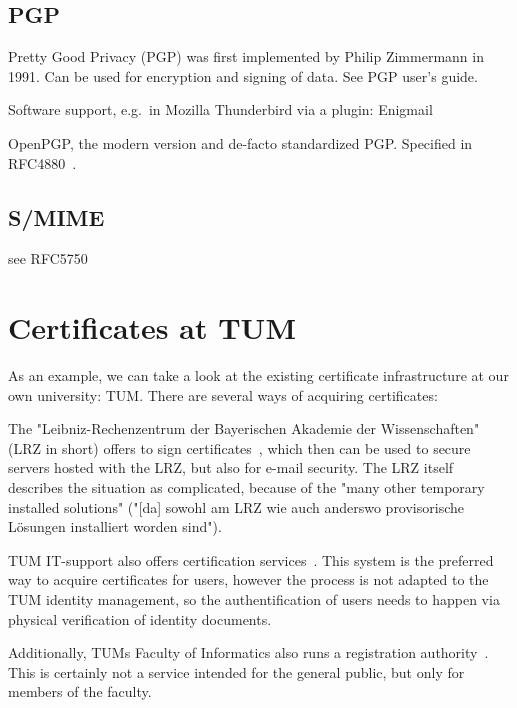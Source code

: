\subsection{PGP}\label{subsec:pgp}

Pretty Good Privacy (PGP) was first implemented by Philip Zimmermann in 1991.
Can be used for encryption and signing of data.
See PGP user's guide.

Software support, e.g.\ in Mozilla Thunderbird via a plugin: Enigmail

OpenPGP, the modern version and de-facto standardized PGP\@.
Specified in RFC4880~\cite{RFC4880}.

\subsection{S/MIME}\label{subsec:s/mime}
see RFC5750~\cite{RFC5750}

\section{Certificates at TUM}\label{sec:certificatesAtTum}
As an example, we can take a look at the existing certificate infrastructure at our own university: TUM\@.
There are several ways of acquiring certificates:

The "Leibniz-Rechenzentrum der Bayerischen Akademie der Wissenschaften" (LRZ in short) offers to sign
certificates~\cite{lrzpki}, which then can be used to secure servers hosted with the LRZ, but also for e-mail security.
The LRZ itself describes the situation as complicated, because of the "many other temporary installed solutions"
("[da] sowohl am LRZ wie auch anderswo provisorische L\"osungen installiert worden sind").

TUM IT-support also offers certification services~\cite{tumZertifikat}.
This system is the preferred way to acquire certificates for users, however the process is not adapted to the TUM
identity management, so the authentification of users needs to happen via physical verification of identity documents.

Additionally, TUMs Faculty of Informatics also runs a registration authority~\cite{inTumCertificates}.
This is certainly not a service intended for the general public, but only for members of the faculty.

